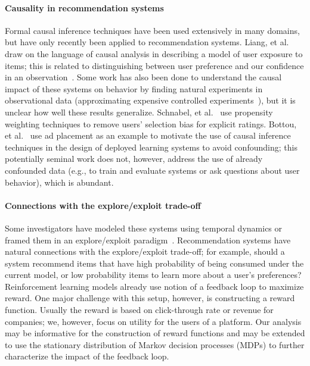 \documentclass[sigconf]{acmart}
\begin{document}
\paragraph{Causality in recommendation systems}
Formal causal inference techniques have been used extensively in many domains, but have only recently been applied to recommendation systems.
Liang, et al.~\cite{liang2016modeling} draw on the language of causal analysis in describing a model of user exposure to items; this is related to distinguishing between user preference and our confidence in an observation~\cite{Hu08collaborativefiltering}.
Some work has also been done to understand the causal impact of these systems on behavior by finding natural experiments in observational data \cite{Sharma:2015,su2016effect} (approximating expensive controlled experiments~\cite{kohavi2009controlled}), but it is unclear how well these results generalize.
Schnabel, et al.~\cite{schnabel2016recommendations} use propensity weighting techniques to remove users' selection bias for explicit ratings.
Bottou, et al.~\cite{bottou2013counterfactual} use ad placement as an example to motivate the use of causal inference techniques in the design of deployed learning systems to avoid confounding; this potentially seminal work does not, however, address the use of already confounded data (e.g., to train and evaluate systems or ask questions about user behavior), which is abundant.

\paragraph{Connections with the explore/exploit trade-off}
Some investigators have modeled these systems using temporal dynamics \cite{koren2010collaborative} or framed them in an explore/exploit paradigm~\cite{Vanchinathan:2014,li2010contextual}.  Recommendation systems have natural connections with the explore/exploit trade-off; for example, should a system recommend items that have high probability of being consumed under the current model, or low probability items to learn more about a user's preferences?  Reinforcement learning models already use notion of a feedback loop to maximize reward.  
One major challenge with this setup, however, is constructing a reward function.  Usually the reward is based on click-through rate or revenue for companies; we, however, focus on utility for the users of a platform.  Our analysis may be informative for the construction of reward functions and may be extended to use the stationary distribution of Markov decision processes (MDPs) to further characterize the impact of the feedback loop.
\end{document}
